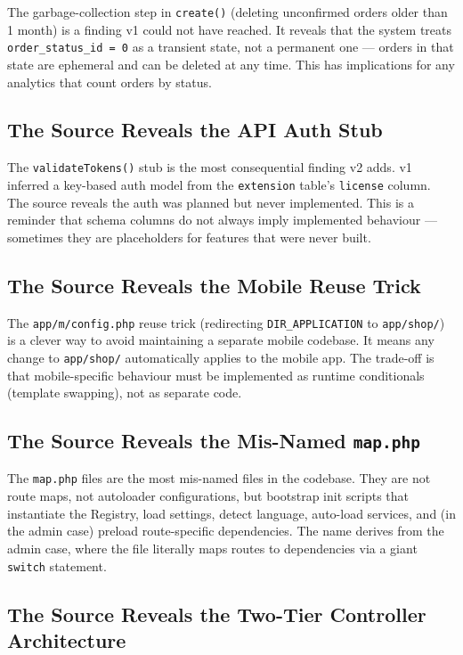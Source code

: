 \documentclass[11pt,a4paper]{article}
\begin{document}
The garbage-collection step in \texttt{create()} (deleting
unconfirmed orders older than 1 month) is a finding v1 could not
have reached. It reveals that the system treats
\texttt{order\_status\_id = 0} as a transient state, not a
permanent one --- orders in that state are ephemeral and can be
deleted at any time. This has implications for any analytics that
count orders by status.

\subsection{The Source Reveals the API Auth Stub}

The \texttt{validateTokens()} stub is the most consequential
finding v2 adds. v1 inferred a key-based auth model from the
\texttt{extension} table's \texttt{license} column. The source
reveals the auth was planned but never implemented. This is a
reminder that schema columns do not always imply implemented
behaviour --- sometimes they are placeholders for features that
were never built.

\subsection{The Source Reveals the Mobile Reuse Trick}

The \texttt{app/m/config.php} reuse trick (redirecting
\texttt{DIR\_APPLICATION} to \texttt{app/shop/}) is a clever way
to avoid maintaining a separate mobile codebase. It means any
change to \texttt{app/shop/} automatically applies to the mobile
app. The trade-off is that mobile-specific behaviour must be
implemented as runtime conditionals (template swapping), not as
separate code.

\subsection{The Source Reveals the Mis-Named \texttt{map.php}}

The \texttt{map.php} files are the most mis-named files in the
codebase. They are not route maps, not autoloader configurations,
but bootstrap init scripts that instantiate the Registry, load
settings, detect language, auto-load services, and (in the admin
case) preload route-specific dependencies. The name derives from
the admin case, where the file literally maps routes to
dependencies via a giant \texttt{switch} statement.

\subsection{The Source Reveals the Two-Tier Controller Architecture}
\end{document}
